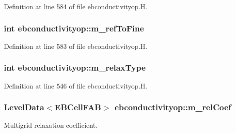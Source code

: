 Definition at line 584 of file ebconductivityop.\+H.

\subsubsection[{\texorpdfstring{m\+\_\+ref\+To\+Fine}{m_refToFine}}]{\setlength{\rightskip}{0pt plus 5cm}int ebconductivityop\+::m\+\_\+ref\+To\+Fine\hspace{0.3cm}{\ttfamily [protected]}}\hypertarget{classebconductivityop_a03974b0dad4bbd5d9993641ff7cacdd4}{}\label{classebconductivityop_a03974b0dad4bbd5d9993641ff7cacdd4}


Definition at line 583 of file ebconductivityop.\+H.

\subsubsection[{\texorpdfstring{m\+\_\+relax\+Type}{m_relaxType}}]{\setlength{\rightskip}{0pt plus 5cm}int ebconductivityop\+::m\+\_\+relax\+Type\hspace{0.3cm}{\ttfamily [protected]}}\hypertarget{classebconductivityop_ad54189fc95d09641e979ebab2e254c13}{}\label{classebconductivityop_ad54189fc95d09641e979ebab2e254c13}


Definition at line 546 of file ebconductivityop.\+H.

\subsubsection[{\texorpdfstring{m\+\_\+rel\+Coef}{m_relCoef}}]{\setlength{\rightskip}{0pt plus 5cm}Level\+Data$<$E\+B\+Cell\+F\+AB$>$ ebconductivityop\+::m\+\_\+rel\+Coef\hspace{0.3cm}{\ttfamily [protected]}}\hypertarget{classebconductivityop_a63a52940fcc2ae9a1dd8e2762fb239e4}{}\label{classebconductivityop_a63a52940fcc2ae9a1dd8e2762fb239e4}


Multigrid relaxation coefficient. 



